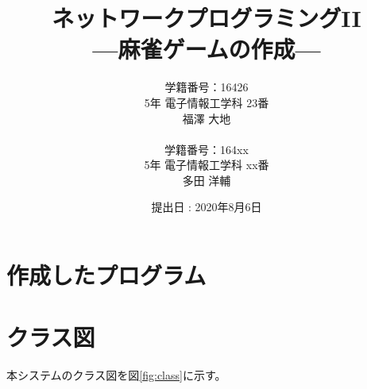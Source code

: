 \documentclass[a4j,titlepage]{jsarticle}
\begin{document}
\begin{titlepage}
  \title{\huge{ネットワークプログラミングI\hspace{-.1em}I} \\ \LARGE{---麻雀ゲームの作成---}}
  \author{
    学籍番号：16426 \\ 5年 電子情報工学科 23番 \\ 福澤 大地 \\ \\
    学籍番号：164xx \\ 5年 電子情報工学科 xx番 \\ 多田 洋輔
  }
	\date{提出日 : 2020年8月6日}
  \maketitle
\end{titlepage}


\section{作成したプログラム}



\section{クラス図}
本システムのクラス図を図\ref{fig:class}に示す。
\end{document}
